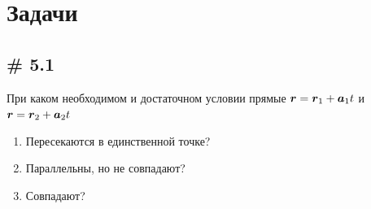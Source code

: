 \documentclass[a4paper,12pt]{article}
\begin{document}
  \section{Задачи}
  
  \subsection{\# 5.1}
  
  \begin{problem}
    При каком необходимом и достаточном условии прямые $\bds r \hm= \bds r_1 \hm+ \bds a_1 t$ и $\bds r \hm= \bds r_2 \hm+ \bds a_2 t$
    \begin{enumerate}
      \item Пересекаются в единственной точке?
      \item Параллельны, но не совпадают?
      \item Совпадают?
    \end{enumerate}
  \end{problem}
  
\end{document}
